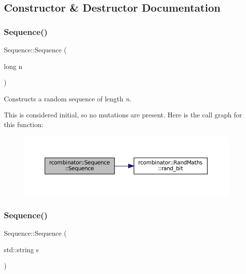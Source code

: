 \subsection{Constructor \& Destructor Documentation}
\mbox{\label{classrcombinator_1_1Sequence_afab8bafaf1283f4e699ba9111ee452b3}} 
\subsubsection{\texorpdfstring{Sequence()}{Sequence()}\hspace{0.1cm}{\footnotesize\ttfamily [1/3]}}
{\footnotesize\ttfamily Sequence\+::\+Sequence (\begin{DoxyParamCaption}\item[{long}]{n }\end{DoxyParamCaption})}



Constructs a random sequence of length {\itshape n}. 

This is considered initial, so no mutations are present. Here is the call graph for this function\+:\nopagebreak
\begin{figure}[H]
\begin{center}
\leavevmode
\includegraphics[width=350pt]{classrcombinator_1_1Sequence_afab8bafaf1283f4e699ba9111ee452b3_cgraph}
\end{center}
\end{figure}
\mbox{\label{classrcombinator_1_1Sequence_af5b3b62eba07f0e09f532fcf1681c289}} 
\subsubsection{\texorpdfstring{Sequence()}{Sequence()}\hspace{0.1cm}{\footnotesize\ttfamily [2/3]}}
{\footnotesize\ttfamily Sequence\+::\+Sequence (\begin{DoxyParamCaption}\item[{std\+::string}]{s }\end{DoxyParamCaption})}



